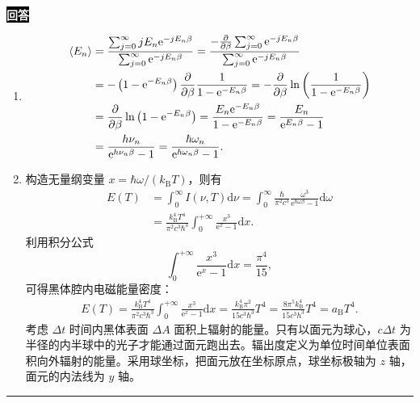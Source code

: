 \documentclass[11pt,a4paper]{ctexart}
\newenvironment{answer}
  {\par\smallskip\noindent
   \begingroup
   \setlength{\fboxsep}{4pt}%
   \colorbox{black}{\textcolor{white}{\bfseries 回答}}%
   \endgroup
   \quad\ignorespaces}
  {\par\smallskip\noindent\rule{\linewidth}{0.4pt}\medskip}
\begin{document}
\begin{answer}
  \begin{enumerate}[label=(1.1.\arabic*),ref=1.1.\arabic*,leftmargin=4.5em]
    \item 
     \begin{equation}
       \begin{aligned}
          \Braket{E_n }
          &=\frac{\sum_{j=0}^{\infty} jE_n \mathrm{e}^{-j E_n\beta} }{\sum_{j=0}^{\infty} \mathrm{e}^{-j E_n \beta} }
          =\frac{-\frac{\partial }{\partial \beta } \sum_{j=0}^{\infty} \mathrm{e}^{-j E_n\beta} }{\sum_{j=0}^{\infty} \mathrm{e}^{-j E_n \beta} } \\ 
          &=-\left(1-\mathrm{e}^{-E_n \beta} \right) \frac{\partial }{\partial \beta } \frac{1 }{1-\mathrm{e}^{-E_n \beta} }
          =-\frac{\partial }{\partial \beta } \ln\left(\frac{1 }{1-\mathrm{e}^{-E_n \beta} }  \right) \\
          &=\frac{\partial }{\partial \beta } \ln\left(1-\mathrm{e}^{-E_n \beta} \right)
          =\frac{E_n \mathrm{e}^{-E_n \beta} }{1-\mathrm{e}^{-E_n \beta} }
          =\frac{E_n  }{\mathrm{e}^{E_n \beta} - 1 } \\
          &=\frac{h\nu_n }{\mathrm{e}^{h\nu_n \beta}-1}
          =\frac{\hbar\omega_n }{\mathrm{e}^{\hbar\omega_n\beta}-1 } .
       \end{aligned}
     \end{equation}
    \item 构造无量纲变量 $x=\hbar\omega / (k_{\mathrm{B}}T) $，则有
    \begin{equation}
      \begin{aligned}
        E(T)
        &=\int_0^\infty I(\nu,T)\mathrm{d}\nu
        =\int_0^\infty\frac{\hbar}{\pi^2c^3}
        \frac{\omega^3}{\mathrm{e}^{\hbar\omega\beta}-1}\mathrm{d}\omega \\
        &=\frac{k_{\mathrm{B}}^4 T^4 }{\pi^2 c^3 \hbar^3 } \int_{0}^{+\infty} \frac{x^3 }{\mathrm{e}^{x}-1 }\mathrm{d}x.
      \end{aligned}
    \end{equation}
    利用积分公式
    \begin{equation}
      \int_{0}^{+\infty} \frac{x^3 }{\mathrm{e}^{x}-1 }\mathrm{d}x
      =\frac{\pi^4 }{15 }, 
    \end{equation}
    可得黑体腔内电磁能量密度：
    \begin{equation}
      \begin{aligned}
        E(T)
        =\frac{k_{\mathrm{B}}^4 T^4 }{\pi^2 c^3 \hbar^3 } \int_{0}^{+\infty} \frac{x^3 }{\mathrm{e}^{x}-1 }\mathrm{d}x
        =\frac{k_{\mathrm{B}}^4\pi^2 }{15 c^3 \hbar^3 } T^4 
        =\frac{8\pi^5 k_{\mathrm{B}}^4 }{15 c^3 h^3 } T^4
        =a_{\mathrm{B}} T^4.
      \end{aligned}
    \end{equation}
    考虑 $\Delta t $ 时间内黑体表面 $\Delta A $ 面积上辐射的能量。只有以面元为球心，$c\Delta t$ 为半径的内半球中的光子才能通过面元跑出去。辐出度定义为单位时间单位表面积向外辐射的能量。采用球坐标，把面元放在坐标原点，球坐标极轴为 $z $ 轴，面元的内法线为 $y $ 轴。


\end{enumerate}
\end{answer}
\end{document}
